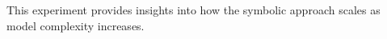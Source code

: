 This experiment provides insights into how the symbolic approach scales as model complexity increases.

